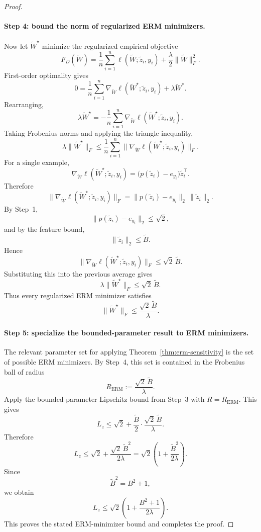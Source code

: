\documentclass[conference,compsoc]{IEEEtran}
\begin{document}
\begin{proof}
\paragraph{Step 4: bound the norm of regularized ERM minimizers.}
Now let $\widetilde W^\star$ minimize the regularized empirical objective
\[
F_D(\widetilde W)
=
\frac{1}{n}\sum_{i=1}^n
\ell(\widetilde W;\widetilde z_i,y_i)
+
\frac{\lambda}{2}\|\widetilde W\|_F^2.
\]
First-order optimality gives
\[
0
=
\frac{1}{n}\sum_{i=1}^n
\nabla_{\widetilde W}\ell(\widetilde W^\star;\widetilde z_i,y_i)
+
\lambda\widetilde W^\star.
\]
Rearranging,
\[
\lambda\widetilde W^\star
=
-
\frac{1}{n}\sum_{i=1}^n
\nabla_{\widetilde W}\ell(\widetilde W^\star;\widetilde z_i,y_i).
\]
Taking Frobenius norms and applying the triangle inequality,
\[
\lambda\|\widetilde W^\star\|_F
\le
\frac{1}{n}\sum_{i=1}^n
\|\nabla_{\widetilde W}\ell(\widetilde W^\star;\widetilde z_i,y_i)\|_F.
\]
For a single example,
\[
\nabla_{\widetilde W}\ell(\widetilde W^\star;\widetilde z_i,y_i)
=
\bigl(p(\widetilde z_i)-e_{y_i}\bigr)\widetilde z_i^\top.
\]
Therefore
\[
\|\nabla_{\widetilde W}\ell(\widetilde W^\star;\widetilde z_i,y_i)\|_F
=
\|p(\widetilde z_i)-e_{y_i}\|_2\,\|\widetilde z_i\|_2.
\]
By Step~1,
\[
\|p(\widetilde z_i)-e_{y_i}\|_2\le \sqrt{2},
\]
and by the feature bound,
\[
\|\widetilde z_i\|_2\le \widetilde B.
\]
Hence
\[
\|\nabla_{\widetilde W}\ell(\widetilde W^\star;\widetilde z_i,y_i)\|_F
\le
\sqrt{2}\,\widetilde B.
\]
Substituting this into the previous average gives
\[
\lambda\|\widetilde W^\star\|_F
\le
\sqrt{2}\,\widetilde B.
\]
Thus every regularized ERM minimizer satisfies
\[
\|\widetilde W^\star\|_F
\le
\frac{\sqrt{2}\,\widetilde B}{\lambda}.
\]

\paragraph{Step 5: specialize the bounded-parameter result to ERM minimizers.}
The relevant parameter set for applying Theorem~\ref{thm:erm-sensitivity} is the set of possible ERM minimizers. By Step~4, this set is contained in the Frobenius ball of radius
\[
R_{\mathrm{ERM}}
:=
\frac{\sqrt{2}\,\widetilde B}{\lambda}.
\]
Apply the bounded-parameter Lipschitz bound from Step~3 with $R=R_{\mathrm{ERM}}$. This gives
\[
L_z
\le
\sqrt{2}
+
\frac{\widetilde B}{2}
\cdot
\frac{\sqrt{2}\,\widetilde B}{\lambda}.
\]
Therefore
\[
L_z
\le
\sqrt{2}
+
\frac{\sqrt{2}\,\widetilde B^2}{2\lambda}
=
\sqrt{2}\left(1+\frac{\widetilde B^2}{2\lambda}\right).
\]
Since
\[
\widetilde B^2=B^2+1,
\]
we obtain
\[
L_z
\le
\sqrt{2}\left(1+\frac{B^2+1}{2\lambda}\right).
\]
This proves the stated ERM-minimizer bound and completes the proof.
\end{proof}
\end{document}
